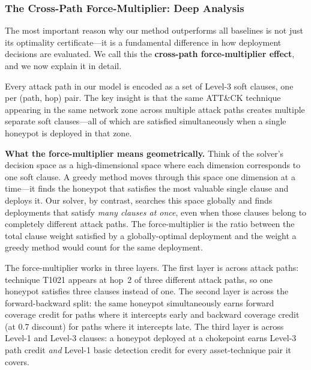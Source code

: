 \documentclass[journal]{IEEEtran}
\begin{document}
\subsubsection{The Cross-Path Force-Multiplier: Deep
               Analysis}
\label{subsec:crosspath}

The most important reason why our method outperforms all
baselines is not just its optimality certificate---it is a
fundamental difference in how deployment decisions are
evaluated.
We call this the \textbf{cross-path force-multiplier
effect}, and we now explain it in detail.

Every attack path in our model is encoded as a set of
Level-3 soft clauses, one per (path, hop) pair.
The key insight is that the same ATT\&CK technique
appearing in the same network zone across multiple attack
paths creates multiple separate soft clauses---all of
which are satisfied simultaneously when a single honeypot
is deployed in that zone.

\begin{insightbox}
\textbf{What the force-multiplier means geometrically.}
Think of the solver's decision space as a high-dimensional
space where each dimension corresponds to one soft clause.
A greedy method moves through this space one dimension at
a time---it finds the honeypot that satisfies the most
valuable single clause and deploys it.
Our solver, by contrast, searches this space globally and
finds deployments that satisfy \emph{many clauses at once},
even when those clauses belong to completely different
attack paths.
The force-multiplier is the ratio between the total clause
weight satisfied by a globally-optimal deployment and the
weight a greedy method would count for the same deployment.
\end{insightbox}

The force-multiplier works in three layers.
The first layer is across attack paths: technique T1021
appears at hop~2 of three different attack paths, so one
honeypot satisfies three clauses instead of one.
The second layer is across the forward-backward split:
the same honeypot simultaneously earns forward coverage
credit for paths where it intercepts early and backward
coverage credit (at 0.7 discount) for paths where it
intercepts late.
The third layer is across Level-1 and Level-3 clauses:
a honeypot deployed at a chokepoint earns Level-3 path
credit \emph{and} Level-1 basic detection credit for every
asset-technique pair it covers.
\end{document}
